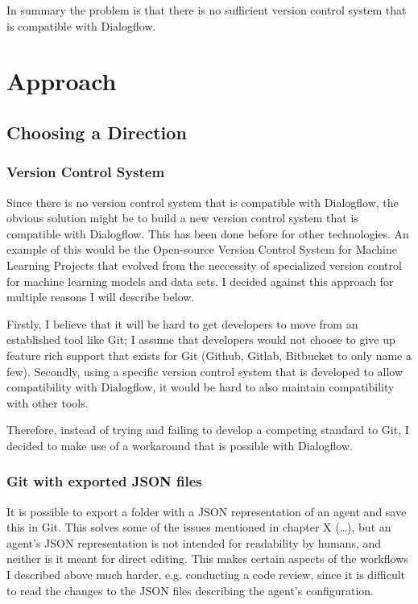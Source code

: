In summary the problem is that there is no sufficient version control system that is compatible with Dialogflow.

\chapter{Approach}

\section{Choosing a Direction}

\subsection{Version Control System}

Since there is no version control system that is compatible with Dialogflow, the obvious solution might be to build a new version control system that is compatible with Dialogflow. This has been done before for other technologies.
An example of this would be the Open-source Version Control System for Machine Learning Projects that evolved from the neccessity of specialized version control for machine learning models and data sets.\cite{Petrov}
I decided against this approach for multiple reasons I will describe below.

Firstly, I believe that it will be hard to get developers to move from an established tool like Git; I assume that developers would not choose to give up feature rich support that exists for Git (Github, Gitlab, Bitbucket to only name a few).
Secondly, using a specific version control system that is developed to allow compatibility with Dialogflow, it would be hard to also maintain compatibility with other tools.

Therefore, instead of trying and failing to develop a competing standard to Git, I decided to make use of a workaround that is possible with Dialogflow.

\subsection{Git with exported JSON files}

It is possible to export a folder with a JSON representation of an agent and save this in Git. This solves some of the issues mentioned in chapter X (…), but an agent's JSON representation is not intended for readability by humans, and neither is it meant for direct editing. This makes certain aspects of the workflows I described above much harder, e.g. conducting a code review, since it is difficult to read the changes to the JSON files describing the agent’s configuration.

